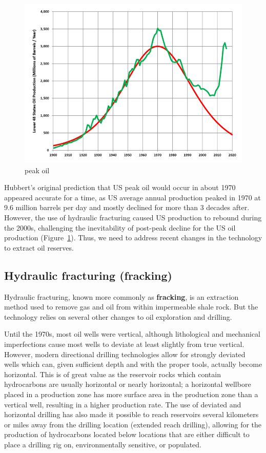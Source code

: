 \begin{figure}[b]
	\centering
		\includegraphics[width=1.00\textwidth]{graphics/Hubbert_Upper-Bound_Peak_1956.png}
	\caption{peak oil}
	\label{fig:Hubbert_Upper-Bound_Peak_1956}
\end{figure}

Hubbert's original prediction that US peak oil would occur in about 1970 appeared accurate for a time, as US average annual production peaked in 1970 at 9.6 million barrels per day and mostly declined for more than 3 decades after. However, the use of hydraulic fracturing caused US production to rebound during the 2000s, challenging the inevitability of post-peak decline for the US oil production (Figure~\ref{fig:Hubbert_Upper-Bound_Peak_1956}). Thus, we need to address recent changes in the technology to extract oil reserves.

\subsection{Hydraulic fracturing (fracking)} 

Hydraulic fracturing, known more commonly as \textbf{fracking}, is an extraction method used to remove gas and oil from within impermeable shale rock. But the technology relies on several other changes to oil exploration and drilling. 

Until the 1970s, most oil wells were vertical, although lithological and mechanical imperfections cause most wells to deviate at least slightly from true vertical. However, modern directional drilling technologies allow for strongly deviated wells which can, given sufficient depth and with the proper tools, actually become horizontal. This is of great value as the reservoir rocks which contain hydrocarbons are usually horizontal or nearly horizontal; a horizontal wellbore placed in a production zone has more surface area in the production zone than a vertical well, resulting in a higher production rate. The use of deviated and horizontal drilling has also made it possible to reach reservoirs several kilometers or miles away from the drilling location (extended reach drilling), allowing for the production of hydrocarbons located below locations that are either difficult to place a drilling rig on, environmentally sensitive, or populated.

